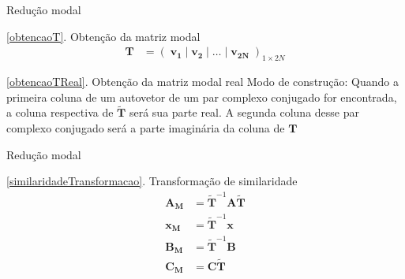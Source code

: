 \documentclass[10pt]{beamer}
\begin{document}
\begin{frame}[fragile]{Redução modal}
\begin{block}{\ref{obtencaoT}. Obtenção da matriz modal}
	\begin{align}
	\mathbf{T} &= \left(\;\mathbf{v_1}\;|\;\mathbf{v_2}\;|\;\ldots\;|\;\mathbf{v_{2N}}\;\right)_{1\times 2N}
\end{align}
\end{block}

\begin{block}{\ref{obtencaoTReal}. Obtenção da matriz modal real}
Modo de construção: Quando a primeira coluna de um autovetor de um par complexo conjugado for encontrada, a coluna respectiva de $\tilde{\mathbf{T}}$ será sua parte real. A segunda coluna desse par complexo conjugado será a parte imaginária da coluna de $\mathbf{T}$
\end{block}

\end{frame}


\begin{frame}[fragile]{Redução modal}
\begin{block}{\ref{similaridadeTransformacao}. Transformação de similaridade}
\begin{align}
	\mathbf{A_M} &= \tilde{\mathbf{T}}^{-1}\mathbf{A}\tilde{\mathbf{T}}\\
	\mathbf{x_M} &=\tilde{\mathbf{T}}^{-1}\mathbf{x}	\\
	\mathbf{B_M} &= \tilde{\mathbf{T}}^{-1}\mathbf{B}\\
	\mathbf{C_M} &=\mathbf{C}\tilde{\mathbf{T}}
\end{align}	
\end{block}

\end{frame}
\end{document}
